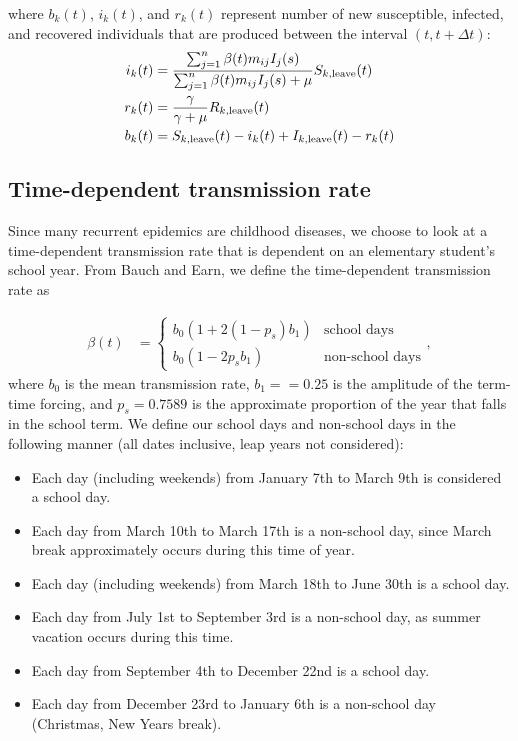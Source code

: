 \documentclass[12pt]{article}\usepackage[]{graphicx}\usepackage[]{color}
\begin{document}
where $b_k(t)$, $i_k(t)$, and $r_k(t)$ represent number of new susceptible, infected, and recovered individuals that are produced between the interval $(t, t+\Delta t)$:
\begin{equation}
\begin{aligned}
i_k(t) &= \frac{\sum_{j=1}^n \beta(t) m_{ij} I_j(s)}{\sum_{j=1}^n \beta(t) m_{ij} I_j(s) + \mu} S_{k, \tiny{\textrm{leave}}}(t)\\
r_k(t) &= \frac{\gamma}{\gamma + \mu} R_{k, \tiny{\textrm{leave}}}(t)\\
b_k(t) &= S_{k, \tiny{\textrm{leave}}}(t) - i_k(t) + I_{k, \tiny{\textrm{leave}}}(t) - r_k(t)\\
\end{aligned}
\end{equation}

\subsection{Time-dependent transmission rate}

Since many recurrent epidemics are childhood diseases, we choose to look at a time-dependent transmission rate that is dependent on an elementary student's school year. From Bauch and Earn, we define the time-dependent transmission rate as

\begin{equation}
\begin{aligned}
\beta (t) &=
\begin{cases} b_0 (1 + 2(1 - p_s) b_1) &\mbox{school days} \\
b_0 (1 - 2 p_s b_1) & \mbox{non-school days}
\end{cases},
\end{aligned}
\end{equation}
where $b_0$ is the mean transmission rate, $b_1 = =0.25$ is the amplitude of the term-time forcing, and $p_s = 0.7589$ is the approximate proportion of the year that falls in the school term. We define our school days and non-school days in the following manner (all dates inclusive, leap years not considered):

\begin{itemize}
\item Each day (including weekends) from January 7th to March 9th is considered a school day.
\item Each day from March 10th to March 17th is a non-school day, since March break approximately occurs during this time of year.
\item Each day (including weekends) from March 18th to June 30th is a school day.
\item Each day from July 1st to September 3rd is a non-school day, as summer vacation occurs during this time.
\item Each day from September 4th to December 22nd is a school day.
\item Each day from December 23rd to January 6th is a non-school day (Christmas, New Years break).
\end{itemize}
\end{document}
